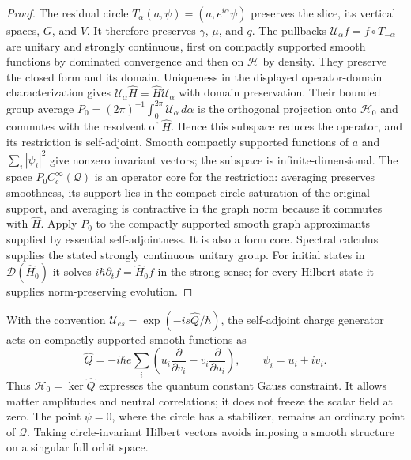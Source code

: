 \begin{proof}
The residual circle \(T_\alpha(a,\psi)=(a,e^{i\alpha}\psi)\)
preserves the slice, its vertical spaces, \(G\), and \(V\). It
therefore preserves \(\gamma\), \(\mu\), and \(q\).
The pullbacks \(\mathcal U_\alpha f=f\circ T_{-\alpha}\)
are unitary and strongly continuous, first on compactly supported smooth
functions by dominated convergence and then on \(\mathcal H\) by
density. They preserve the closed form and its domain. Uniqueness in
the displayed operator-domain characterization gives
\(\mathcal U_\alpha\widehat H=\widehat H\mathcal U_\alpha\)
with domain preservation. Their bounded group average
\(P_0=(2\pi)^{-1}\int_0^{2\pi}\mathcal U_\alpha\,d\alpha\)
is the orthogonal projection onto \(\mathcal H_0\) and commutes
with the resolvent of \(\widehat H\). Hence this subspace reduces
the operator, and its restriction is self-adjoint. Smooth compactly
supported functions of \(a\) and \(\sum_i|\psi_i|^2\)
give nonzero invariant vectors; the subspace is infinite-dimensional.
The space \(P_0C_c^\infty(\mathcal Q)\) is an operator core
for the restriction: averaging preserves smoothness, its support lies
in the compact circle-saturation of the original support, and averaging
is contractive in the graph norm because it commutes with \(\widehat H\).
Apply \(P_0\) to the compactly supported smooth graph approximants supplied
by essential self-adjointness. It is also a form core.
Spectral calculus supplies the stated strongly continuous unitary group.
For initial states in \(\mathcal D(\widehat H_0)\) it solves
\(i\hbar\partial_t f=\widehat H_0f\) in the strong sense; for
every Hilbert state it supplies norm-preserving evolution.
\end{proof}

With the convention
\(\mathcal U_{es}=\exp(-is\widehat Q/\hbar)\), the
self-adjoint charge generator acts
on compactly supported smooth functions as
\[
 \widehat Q=-i\hbar e\sum_i
       \left(u_i\frac{\partial}{\partial v_i}
                  -v_i\frac{\partial}{\partial u_i}\right),
 \qquad \psi_i=u_i+iv_i.
\]
Thus \(\mathcal H_0=\ker\widehat Q\) expresses the quantum
constant Gauss constraint. It allows matter amplitudes and neutral
correlations; it does not freeze the scalar field at zero.
The point \(\psi=0\), where the circle has a stabilizer, remains
an ordinary point of \(\mathcal Q\). Taking circle-invariant Hilbert
vectors avoids imposing a smooth structure on a singular full orbit space.

